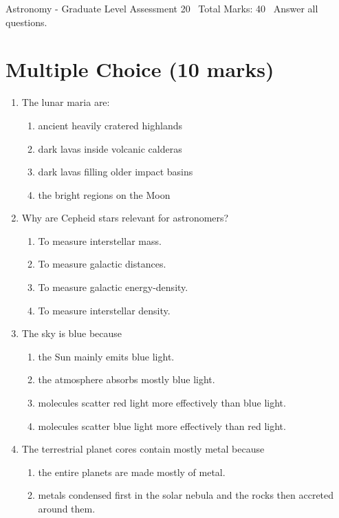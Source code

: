\documentclass[12pt]{article}
\begin{document}
\begin{center}
Astronomy - Graduate Level Assessment 20 \
Total Marks: 40 \
Answer all questions.
\end{center}

\section*{Multiple Choice (10 marks)}
\begin{enumerate}[label=\arabic*.]
\item The lunar maria are:
\begin{enumerate}[label=(\alph*)]
    \item ancient heavily cratered highlands
    \item dark lavas inside volcanic calderas
    \item dark lavas filling older impact basins
    \item the bright regions on the Moon
\end{enumerate}
\item Why are Cepheid stars relevant for astronomers?
\begin{enumerate}[label=(\alph*)]
    \item To measure interstellar mass.
    \item To measure galactic distances.
    \item To measure galactic energy-density.
    \item To measure interstellar density.
\end{enumerate}
\item The sky is blue because
\begin{enumerate}[label=(\alph*)]
    \item the Sun mainly emits blue light.
    \item the atmosphere absorbs mostly blue light.
    \item molecules scatter red light more effectively than blue light.
    \item molecules scatter blue light more effectively than red light.
\end{enumerate}
\item The terrestrial planet cores contain mostly metal because
\begin{enumerate}[label=(\alph*)]
    \item the entire planets are made mostly of metal.
    \item metals condensed first in the solar nebula and the rocks then accreted around them.

\end{enumerate}
\end{enumerate}
\end{document}
